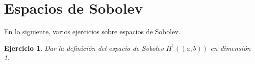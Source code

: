 \documentclass[11pt]{report}
\newtheorem{ex}{Ejercicio}
\newenvironment{solution}{\begin{proof}[Solución]}{\end{proof}}
\newcommand{\inner}[2]{( #1, #2 )_V}
\newcommand{\Ldos}{L^2}
\newcommand{\Huno}{H^1}
\begin{document}

\section{Espacios de Sobolev}

\noindent %
En lo siguiente, varios ejercicios sobre espacios de Sobolev.

\begin{ex}
Dar la definición del espacio de Sobolev $\Huno((a, b))$ en dimensión 1.
\end{ex}











\end{document}
